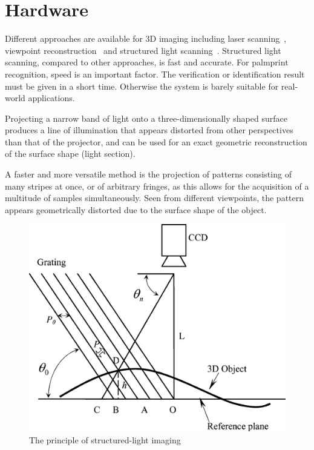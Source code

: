 \section{Hardware}
\label{sec:pastwork:hardware}


Different approaches are available for 3D imaging including laser scanning~\cite{Blais:1988te}, viewpoint reconstruction~\cite{Hartley:2000un} and structured light scanning~\cite{Halioua:1984ue}. Structured light scanning, compared to other approaches, is fast and accurate. For palmprint recognition, speed is an important factor. The verification or identification result must be given in a short time. Otherwise the system is barely suitable for real-world applications.


Projecting a narrow band of light onto a three-dimensionally shaped surface produces a line of illumination that appears distorted from other perspectives than that of the projector, and can be used for an exact geometric reconstruction of the surface shape (light section).

A faster and more versatile method is the projection of patterns consisting of many stripes at once, or of arbitrary fringes, as this allows for the acquisition of a multitude of samples simultaneously. Seen from different viewpoints, the pattern appears geometrically distorted due to the surface shape of the object.

\begin{figure}[htb]
\begin{center}
\includegraphics[width=0.9\linewidth]{ch-pastwork/figures/sli}
\caption[The principle of structured-light imaging]{The principle of structured-light imaging\cite{Li:2009eq}}
\label{fig:pastwork:sli}
\end{center}
\end{figure}


